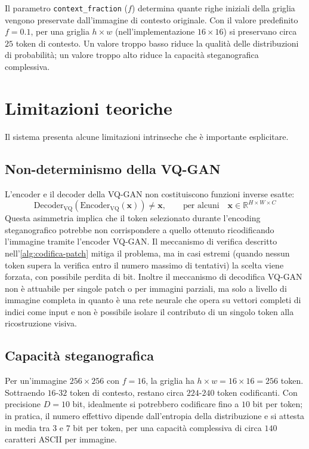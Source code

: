 Il parametro \texttt{context\_fraction} ($f$) determina quante righe iniziali della griglia vengono preservate dall'immagine di contesto originale. Con il valore predefinito $f = 0.1$, per una griglia $h \times w$ (nell'implementazione $16 \times 16$) si preservano circa $25$ token di contesto. Un valore troppo basso riduce la qualità delle distribuzioni di probabilità; un valore troppo alto riduce la capacità steganografica complessiva.

\section{Limitazioni teoriche}
\label{sec:limitazioni}

Il sistema presenta alcune limitazioni intrinseche che è importante esplicitare.

\subsection{Non-determinismo della VQ-GAN}

L'encoder e il decoder della VQ-GAN non costituiscono funzioni inverse esatte:
\[
\mathrm{Decoder_{VQ}}(\mathrm{Encoder_{VQ}}(\mathbf{x})) \ne \mathbf{x}, \qquad \text{per alcuni} \quad \mathbf{x} \in \mathbb{R}^{H \times W \times C}
\]
Questa asimmetria implica che il token selezionato durante l'encoding steganografico potrebbe non corrispondere a quello ottenuto ricodificando l'immagine tramite l'encoder VQ-GAN. Il meccanismo di verifica descritto nell'\autoref{alg:codifica-patch} mitiga il problema, ma in casi estremi (quando nessun token supera la verifica entro il numero massimo di tentativi) la scelta viene forzata, con possibile perdita di bit. Inoltre il meccanismo di decodifica VQ-GAN non è attuabile per singole patch o per immagini parziali, ma solo a livello di immagine completa in quanto è una rete neurale che opera su vettori completi di indici come input e non è possibile isolare il contributo di un singolo token alla ricostruzione visiva.

\subsection{Capacità steganografica}

Per un'immagine $256 \times 256$ con $f = 16$, la griglia ha $h \times w = 16 \times 16 = 256$ token. Sottraendo $16$-$32$ token di contesto, restano circa $224$-$240$ token codificanti. Con precisione $D = 10$ bit, idealmente si potrebbero codificare fino a $10$ bit per token; in pratica, il numero effettivo dipende dall'entropia della distribuzione e si attesta in media tra $3$ e $7$ bit per token, per una capacità complessiva di circa $140$ caratteri ASCII per immagine.